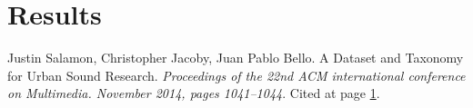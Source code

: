\documentclass[letterpaper, 12pt]{article}
\begin{document}
	\section{Results}
	
	\begin{thebibliography}{99}
		
		Justin Salamon, Christopher Jacoby, Juan Pablo Bello. A Dataset and Taxonomy for Urban Sound Research. \textit{Proceedings of the 22nd ACM international conference on Multimedia. November 2014, pages 1041–1044}. Cited at page \hyperlink{page.1}{1}.
		
		
	\end{thebibliography}

	
	
\end{document}
